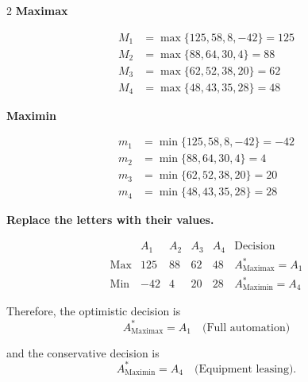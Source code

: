 {\begin{multicols}{2}
				\textbf{Maximax}
				
				\[
				\begin{array}{ll}
					M_1 &= \max\{125,58,8,-42\}=125\\
					M_2 &= \max\{88,64,30,4\}=88\\
					M_3 &= \max\{62,52,38,20\}=62\\
					M_4 &= \max\{48,43,35,28\}=48
				\end{array}
				\]
				
				\textbf{Maximin}
				
				\[
				\begin{array}{ll}
					m_1 &= \min\{125,58,8,-42\}=-42\\
					m_2 &= \min\{88,64,30,4\}=4\\
					m_3 &= \min\{62,52,38,20\}=20\\
					m_4 &= \min\{48,43,35,28\}=28
				\end{array}
				\]
				
				\columnbreak
				
				\textbf{Replace the letters with their values.}
				
				\[
				\begin{array}{c|ccccc}
					& A_1 & A_2 & A_3 & A_4 & \text{Decision}\\
					\hline
					\text{Max} &
					125 & 88 & 62 & 48 &
					A^*_{\mathrm{Maximax}}=A_1
					\\
					\text{Min} &
					-42 & 4 & 20 & 28 &
					A^*_{\mathrm{Maximin}}=A_4
				\end{array}
				\]
					
					Therefore, the optimistic decision is
					\[
					A^*_{\mathrm{Maximax}}=A_1
					\quad\text{(Full automation)}
					\]
					
					and the conservative decision is
					\[
					A^*_{\mathrm{Maximin}}=A_4
					\quad\text{(Equipment leasing)}.
					\]
					
				\end{multicols}
			}
			
